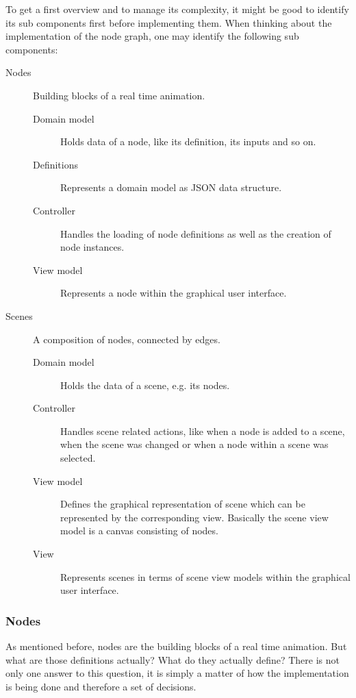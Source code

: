\documentclass[10pt, openright, notitlepage]{scrreprt}
\begin{document}
To get a first overview and to manage its complexity, it might be good to
identify its sub components first before implementing them.
When thinking about the implementation of the node graph, one may identify the
following sub components:

\begin{description}
\item[{Nodes}] Building blocks of a real time animation.
\begin{description}
\item[{Domain model}] Holds data of a node, like its definition, its inputs and so
on.
\item[{Definitions }] Represents a domain model as JSON data structure.
\item[{Controller  }] Handles the loading of node definitions as well as the
creation of node instances.
\item[{View model  }] Represents a node within the graphical user interface.
\end{description}

\item[{Scenes}] A composition of nodes, connected by edges.
\begin{description}
\item[{Domain model}] Holds the data of a scene, e.g. its nodes.
\item[{Controller  }] Handles scene related actions, like when a node is added to
a scene, when the scene was changed or when a node within a
scene was selected.
\item[{View model  }] Defines the graphical representation of scene which can be
represented by the corresponding view. Basically the scene
view model is a canvas consisting of nodes.
\item[{View        }] Represents scenes in terms of scene view models within the
graphical user interface.
\end{description}
\end{description}

\subsubsection{Nodes}
\label{sec:orgb5a6626}

As mentioned before, nodes are the building blocks of a real time animation. But
what are those definitions actually? What do they actually define? There is not
only one answer to this question, it is simply a matter of how the
implementation is being done and therefore a set of decisions.
\end{document}
